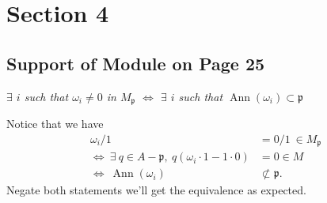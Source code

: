 \section{Section 4}

\subsection{Support of Module on Page 25}

\textit{$\exists$ $i$ such that $\omega_i\neq 0$ in $M_{\mathfrak p}$ $\Leftrightarrow$ $\exists$ $i$ such that $\operatorname{Ann}(\omega_i)\subset \mathfrak p$}

Notice that we have \begin{align*}
    \omega_i/1 &= 0/1 ~\in M_{\mathfrak p} \\
    \Leftrightarrow~ \exists~ q\in A-\mathfrak p,~ q(\omega_i\cdot 1-1\cdot 0) &=0\in M \\
    \Leftrightarrow~ \operatorname{Ann}(\omega_i) &\not\subset \mathfrak p.
\end{align*}
Negate both statements we'll get the equivalence as expected.